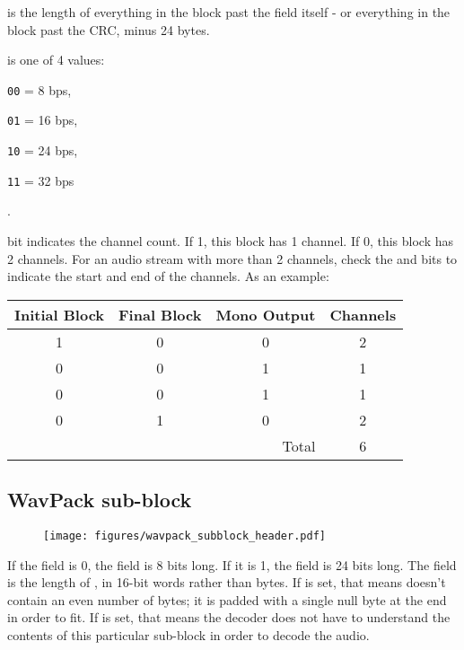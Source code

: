  is the length of everything in the block past
the  field itself -
or everything in the block past the CRC, minus 24 bytes.

 is one of 4 values:

\begin{inparaenum}
\item[\texttt{00} = ] 8 bps,
\item[\texttt{01} = ] 16 bps,
\item[\texttt{10} = ] 24 bps,
\item[\texttt{11} = ] 32 bps
\end{inparaenum}
.

 bit indicates the channel count.
If 1, this block has 1 channel.
If 0, this block has 2 channels.
For an audio stream with more than 2 channels,
check the  and  bits to indicate
the start and end of the channels.  As an example:

\begin{tabular}{c|c|c|c}
Initial Block & Final Block & Mono Output & Channels \\
\hline
1 & 0 & 0 & 2 \\
0 & 0 & 1 & 1 \\
0 & 0 & 1 & 1 \\
0 & 1 & 0 & 2 \\
\hline
\multicolumn{3}{r|}{Total} & 6
\end{tabular}

\clearpage

\subsection{WavPack sub-block}
\begin{figure}[h]
\texttt{[image: figures/wavpack\_subblock\_header.pdf]}
\end{figure}
\par
\noindent
If the  field is 0, the  field is 8 bits long.
If it is 1, the  field is 24 bits long.
The  field is the length of , in 16-bit
words rather than bytes.
If  is set, that means  doesn't contain
an even number of bytes; it is padded with a single null byte at the
end in order to fit.
If  is set, that means the decoder does not have
to understand the contents of this particular sub-block in
order to decode the audio.

